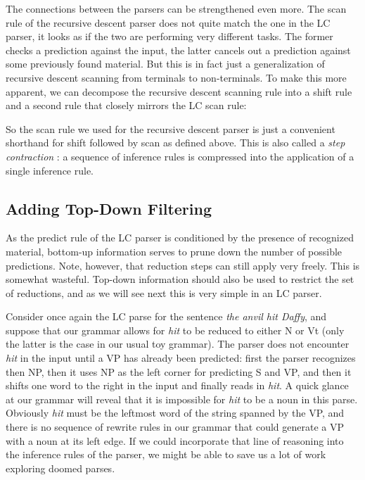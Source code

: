 The connections between the parsers can be strengthened even more.
The scan rule of the recursive descent parser does not quite match the one in the LC parser, it looks as if the two are performing very different tasks.
The former checks a prediction against the input, the latter cancels out a prediction against some previously found material.
But this is in fact just a generalization of recursive descent scanning from terminals to non-terminals.
To make this more apparent, we can decompose the recursive descent scanning rule into a shift rule and a second rule that closely mirrors the LC scan rule:
%
\begin{prooftree}
\end{prooftree}
%
\begin{prooftree}
\end{prooftree}
%
So the scan rule we used for the recursive descent parser is just a convenient shorthand for shift followed by scan as defined above.
This is also called a \emph{step contraction} \citep{Sikkel97}: a sequence of inference rules is compressed into the application of a single inference rule.

\subsection{Adding Top-Down Filtering}

As the predict rule of the LC parser is conditioned by the presence of recognized material, bottom-up information serves to prune down the number of possible predictions.
Note, however, that reduction steps can still apply very freely.
This is somewhat wasteful.
Top-down information should also be used to restrict the set of reductions, and as we will see next this is very simple in an LC parser.

Consider once again the LC parse for the sentence \emph{the anvil hit Daffy}, and suppose that our grammar allows for \emph{hit} to be reduced to either N or Vt (only the latter is the case in our usual toy grammar).
The parser does not encounter \emph{hit} in the input until a VP has already been predicted: first the parser recognizes then NP, then it uses NP as the left corner for predicting S and VP, and then it shifts one word to the right in the input and finally reads in \emph{hit}.
A quick glance at our grammar will reveal that it is impossible for \emph{hit} to be a noun in this parse.
Obviously \emph{hit} must be the leftmost word of the string spanned by the VP, and there is no sequence of rewrite rules in our grammar that could generate a VP with a noun at its left edge.
If we could incorporate that line of reasoning into the inference rules of the parser, we might be able to save us a lot of work exploring doomed parses.

